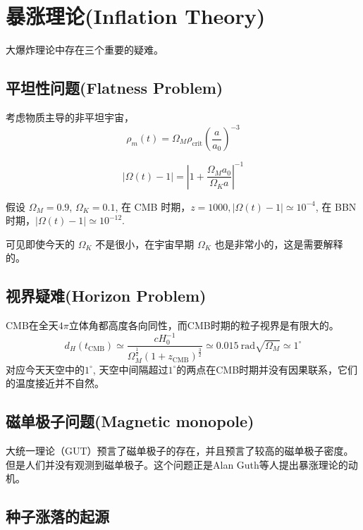 \documentclass[12pt]{ctexart}
\begin{document}
\section{暴涨理论(Inflation Theory)}

大爆炸理论中存在三个重要的疑难。

\subsection{平坦性问题(Flatness Problem)}
考虑物质主导的非平坦宇宙，
\begin{equation}
    \rho_m(t) = \Omega_M \rho_\text{crit} \left( \frac{a}{a_0}\right)^{-3}
\end{equation}

\begin{equation}
    |\Omega(t)-1| = \left|1+\frac{\Omega_M a_0}{\Omega_K a}\right|^{-1}
\end{equation}
%

假设 $\Omega_M = 0.9$, $\Omega_K = 0.1$, 
在 CMB 时期，$z=1000,  |\Omega(t)-1|  \simeq 10^{-4}$,
在 BBN 时期，$ |\Omega(t)-1|  \simeq  10^{-12}$.

可见即使今天的 $\Omega_K$ 不是很小，在宇宙早期  $\Omega_K$ 也是非常小的，这是需要解释的。

\subsection{视界疑难(Horizon Problem)}

CMB在全天$4\pi$立体角都高度各向同性，而CMB时期的粒子视界是有限大的。
\begin{equation}
    d_H (t_\text{CMB}) \simeq \frac{cH_0^{-1}}{\Omega_M^\frac{1}{2}\left(1+z_\text{CMB}\right)^\frac{3}{2} } \simeq 0.015 \mathrm{~rad} \sqrt{\Omega_M} \simeq 1^\circ 
\end{equation}
对应今天天空中的$1^\circ $, 天空中间隔超过$1^\circ $的两点在CMB时期并没有因果联系，它们的温度接近并不自然。

\subsection{磁单极子问题(Magnetic monopole)}

大统一理论（GUT）预言了磁单极子的存在，并且预言了较高的磁单极子密度。但是人们并没有观测到磁单极子。这个问题正是Alan Guth等人提出暴涨理论的动机。

\subsection{种子涨落的起源}
\end{document}
